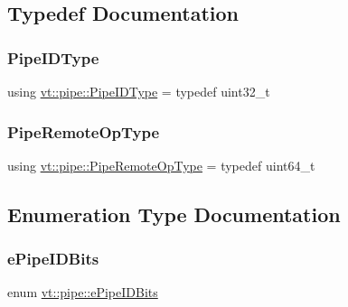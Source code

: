 \subsection{Typedef Documentation}
\mbox{\label{namespacevt_1_1pipe_a8aa7908de242917ac0922b9e9c85fea4}} 
\subsubsection{\texorpdfstring{Pipe\+I\+D\+Type}{PipeIDType}}
{\footnotesize\ttfamily using \hyperlink{namespacevt_1_1pipe_a8aa7908de242917ac0922b9e9c85fea4}{vt\+::pipe\+::\+Pipe\+I\+D\+Type} = typedef uint32\+\_\+t}

\mbox{\label{namespacevt_1_1pipe_a9f156f00d06693969d89a230a38eab52}} 
\subsubsection{\texorpdfstring{Pipe\+Remote\+Op\+Type}{PipeRemoteOpType}}
{\footnotesize\ttfamily using \hyperlink{namespacevt_1_1pipe_a9f156f00d06693969d89a230a38eab52}{vt\+::pipe\+::\+Pipe\+Remote\+Op\+Type} = typedef uint64\+\_\+t}



\subsection{Enumeration Type Documentation}
\mbox{\label{namespacevt_1_1pipe_a21eef17afd7b326e3b65894dffa25901}} 
\subsubsection{\texorpdfstring{e\+Pipe\+I\+D\+Bits}{ePipeIDBits}}
{\footnotesize\ttfamily enum \hyperlink{namespacevt_1_1pipe_a21eef17afd7b326e3b65894dffa25901}{vt\+::pipe\+::e\+Pipe\+I\+D\+Bits}}

